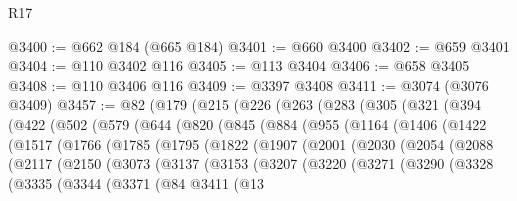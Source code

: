 \begin{lexlean}{R17}
\begin{coremodule}
@3400 := @662 @184 (@665 @184)
@3401 := @660 @3400
@3402 := @659 @3401
@3404 := @110 @3402 @116
@3405 := @113 @3404
@3406 := @658 @3405
@3408 := @110 @3406 @116
@3409 := @3397 @3408
@3411 := @3074 (@3076 @3409)
@3457 := @82
    (@179
      (@215
        (@226
          (@263
            (@283
              (@305
                (@321
                  (@394
                    (@422
                      (@502
                        (@579
                          (@644
                            (@820
                              (@845
                                (@884
                                  (@955
                                    (@1164
                                      (@1406
                                        (@1422
                                          (@1517
                                            (@1766
                                              (@1785
                                                (@1795
                                                  (@1822
                                                    (@1907
                                                      (@2001
                                                        (@2030
                                                          (@2054
                                                            (@2088
                                                              (@2117
                                                                (@2150
                                                                  (@3073
                                                                    (@3137
                                                                      (@3153
                                                                        (@3207
                                                                          (@3220
                                                                            (@3271
                                                                              (@3290
                                                                                (@3328
                                                                                  (@3335
                                                                                    (@3344
                                                                                      (@3371
                                                                                        (@84
                                                                                          @3411
                                                                                          (@13

\end{coremodule}
\end{lexlean}
